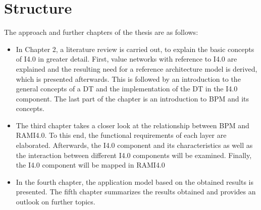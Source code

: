 \section{Structure}
The approach and further chapters of the thesis are as follows:
\begin{itemize}
    \item[] In Chapter 2, a literature review is carried out, to explain the basic concepts of \ac{I4.0} in greater detail. First, value networks with reference to \ac{I4.0} are explained and the resulting need for a reference architecture model is derived, which is presented afterwards. This is followed by an introduction to the general concepts of a \ac{DT} and the implementation of the \ac{DT} in the \ac{I4.0} component. The last part of the chapter is an introduction to \ac{BPM} and its concepts. 
    
    \item[] The third chapter takes a closer look at the relationship between \ac{BPM} and \ac{RAMI4.0}. To this end, the functional requirements of each layer are elaborated. Afterwards, the \ac{I4.0} component and its characteristics as well as the interaction between different \ac{I4.0} components will be examined. Finally, the \ac{I4.0} component will be mapped in \ac{RAMI4.0}
    
    \item In the fourth chapter, the application model based on the obtained results is presented. The fifth chapter summarizes the results obtained and provides an outlook on further topics. 
\end{itemize}






